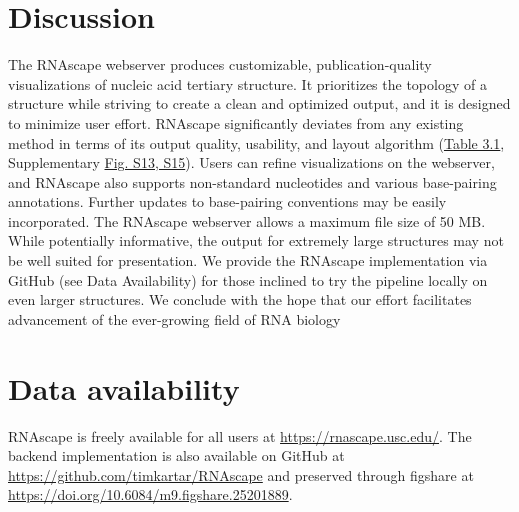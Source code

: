 \section{Discussion}

The RNAscape webserver produces customizable, publication-quality visualizations of nucleic acid tertiary structure. It prioritizes the topology of a structure while striving to create a clean and optimized output, and it is designed to minimize user effort. RNAscape significantly deviates from any existing method in terms of its output quality, usability, and layout algorithm (\hyperref[table:rnascape]{Table 3.1}, Supplementary \hyperref[fig:rnascapeS3]{Fig. S13, S15}). Users can refine visualizations on the webserver, and RNAscape also supports non-standard nucleotides and various base-pairing annotations. Further updates to base-pairing conventions may be easily incorporated. The RNAscape webserver allows a maximum file size of 50 MB. While potentially informative, the output for extremely large structures may not be well suited for presentation. We provide the RNAscape implementation via GitHub (see Data Availability) for those inclined to try the pipeline locally on even larger structures. We conclude with the hope that our effort facilitates advancement of the ever-growing field of RNA biology

\section{Data availability}

RNAscape is freely available for all users at \url{https://rnascape.usc.edu/}. The backend implementation is also available on GitHub at \url{https://github.com/timkartar/RNAscape} and preserved through figshare at \url{https://doi.org/10.6084/m9.figshare.25201889}.